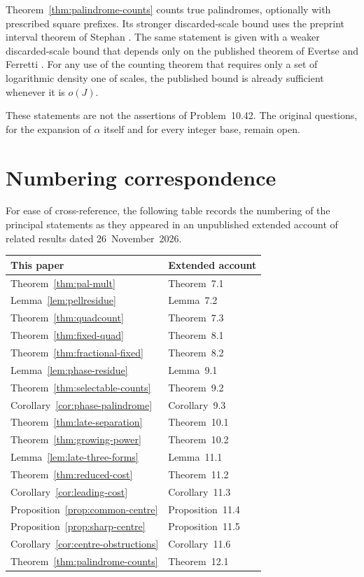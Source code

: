 \documentclass[11pt,reqno,a4paper]{amsart}
\theoremstyle{remark}
\begin{document}
Theorem~\ref{thm:palindrome-counts} counts true palindromes, optionally with prescribed square prefixes. Its stronger discarded-scale bound uses the preprint interval theorem of Stephan \cite{Stephan}. The same statement is given with a weaker discarded-scale bound that depends only on the published theorem of Evertse and Ferretti \cite{EF}. For any use of the counting theorem that requires only a set of logarithmic density one of scales, the published bound is already sufficient whenever it is $o(J)$.

These statements are not the assertions of Problem~10.42. The original questions, for the expansion of $\alpha$ itself and for every integer base, remain open.








\section*{Numbering correspondence}
For ease of cross-reference, the following table records the numbering of the principal statements as they appeared in an unpublished extended account of related results dated 26~November~2026.
\begin{center}
\begin{tabular}{@{}ll@{}}
\toprule
This paper & Extended account \\
\midrule
Theorem~\ref{thm:pal-mult} & Theorem~7.1 \\
Lemma~\ref{lem:pellresidue} & Lemma~7.2 \\
Theorem~\ref{thm:quadcount} & Theorem~7.3 \\
Theorem~\ref{thm:fixed-quad} & Theorem~8.1 \\
Theorem~\ref{thm:fractional-fixed} & Theorem~8.2 \\
Lemma~\ref{lem:phase-residue} & Lemma~9.1 \\
Theorem~\ref{thm:selectable-counts} & Theorem~9.2 \\
Corollary~\ref{cor:phase-palindrome} & Corollary~9.3 \\
Theorem~\ref{thm:late-separation} & Theorem~10.1 \\
Theorem~\ref{thm:growing-power} & Theorem~10.2 \\
Lemma~\ref{lem:late-three-forms} & Lemma~11.1 \\
Theorem~\ref{thm:reduced-cost} & Theorem~11.2 \\
Corollary~\ref{cor:leading-cost} & Corollary~11.3 \\
Proposition~\ref{prop:common-centre} & Proposition~11.4 \\
Proposition~\ref{prop:sharp-centre} & Proposition~11.5 \\
Corollary~\ref{cor:centre-obstructions} & Corollary~11.6 \\
Theorem~\ref{thm:palindrome-counts} & Theorem~12.1 \\
\bottomrule
\end{tabular}
\end{center}
\end{document}
